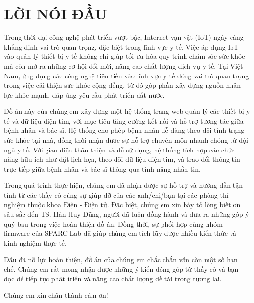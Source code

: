 \section*{LỜI NÓI ĐẦU} %
\thispagestyle{empty}
Trong thời đại công nghệ phát triển vượt bậc, Internet vạn vật (IoT) ngày càng khẳng định vai trò quan trọng, đặc biệt trong lĩnh vực y tế. Việc áp dụng IoT vào quản lý thiết bị y tế không chỉ giúp tối ưu hóa quy trình chăm sóc sức khỏe mà còn mở ra những cơ hội đổi mới, nâng cao chất lượng dịch vụ y tế.
Tại Việt Nam, ứng dụng các công nghệ tiên tiến vào lĩnh vực y tế đóng vai trò quan trọng trong việc cải thiện sức khỏe cộng đồng, từ đó góp phần xây dựng nguồn nhân lực khỏe mạnh, đáp ứng yêu cầu phát triển đất nước.

Đồ án này của chúng em xây dựng một hệ thống trang web quản lý các thiết bị y tế và dữ liệu điện tim, với mục tiêu tăng cường kết nối và hỗ trợ tương tác giữa bệnh nhân và bác sĩ.
Hệ thống cho phép bệnh nhân dễ dàng theo dõi tình trạng sức khỏe tại nhà, đồng thời nhận được sự hỗ trợ chuyên môn nhanh chóng từ đội ngũ y tế. Với giao diện thân thiện và dễ sử dụng, hệ thống tích hợp các chức năng hữu ích như đặt lịch hẹn, theo dõi dữ liệu điện tim, và trao đổi thông tin trực tiếp giữa bệnh nhân và bác sĩ thông qua tính năng nhắn tin.

Trong quá trình thực hiện, chúng em đã nhận được sự hỗ trợ và hướng dẫn tận tình từ các thầy cô cùng sự giúp đỡ của các anh/chị/bạn tại các phòng thí nghiệm thuộc khoa Điện - Điện tử. Đặc biệt, chúng em xin bày tỏ lòng biết ơn sâu sắc đến TS. Hàn Huy Dũng, người đã luôn đồng hành và đưa ra những góp ý quý báu trong việc hoàn thiện đồ án.
Đồng thời, sự phối hợp cùng nhóm firmware của SPARC Lab đã giúp chúng em tích lũy được nhiều kiến thức và kinh nghiệm thực tế.

Dẫu đã nỗ lực hoàn thiện, đồ án của chúng em chắc chắn vẫn còn một số hạn chế. Chúng em rất mong nhận được những ý kiến đóng góp từ thầy cô và bạn đọc để tiếp tục phát triển và nâng cao chất lượng đề tài trong tương lai.

Chúng em xin chân thành cảm ơn!



\cleardoublepage
